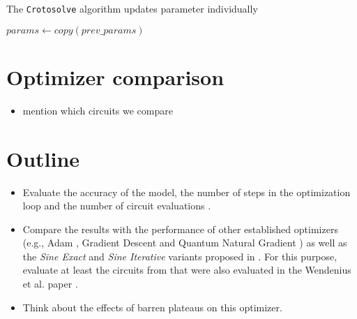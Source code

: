 \begin{algorithm}
    \caption{The \texttt{Crotosolve} algorithm updates parameter individually}
    \label{alg:crotosolve}
    \BlankLine
    $params \gets copy(prev\_params)$\;
\end{algorithm}

\section{Optimizer comparison}
\label{sec:optimizer-comparison}

\begin{itemize}
    \item mention which circuits we compare \cite{sim_expressibility_2019}
\end{itemize}


\section{Outline}
\begin{itemize}
    \item
        Evaluate the accuracy of the model, the number of steps in the
        optimization loop and the number of circuit evaluations
        \cite{wendenius_gradient-free_2023,ostaszewski_structure_2021}.
    \item
        Compare the results with the performance of other established
        optimizers (e.g., Adam \cite{kingma_adam_2017}, Gradient Descent and
        Quantum Natural Gradient \cite{stokes_quantum_2020}) as well as the
        \emph{Sine Exact} and \emph{Sine Iterative} variants proposed in
        \cite{wendenius_gradient-free_2023}.
        For this purpose, evaluate at least the circuits from
        \cite{sim_expressibility_2019} that were also evaluated in the
        Wendenius et al. paper \cite{wendenius_gradient-free_2023}.
    \item
        Think about the effects of barren plateaus on this optimizer.
\end{itemize}
